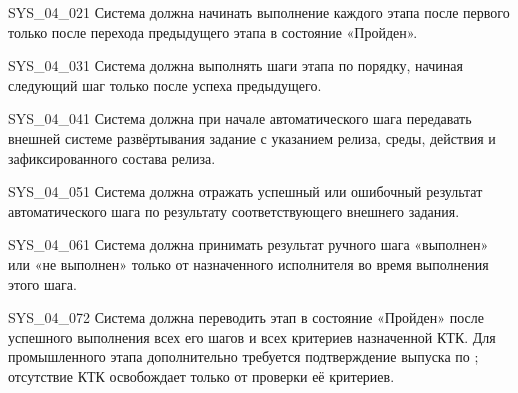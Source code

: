 \documentclass{tpks}
\begin{document}
\begin{req}{SYS_04_02}{1}
Система должна начинать выполнение каждого этапа после первого только после перехода предыдущего этапа в состояние «Пройден».
\end{req}

\begin{req}{SYS_04_03}{1}
Система должна выполнять шаги этапа по порядку, начиная следующий шаг только после успеха предыдущего.
\end{req}

\begin{req}{SYS_04_04}{1}
Система должна при начале автоматического шага передавать внешней системе развёртывания задание с указанием релиза, среды, действия и зафиксированного состава релиза.
\end{req}

\begin{req}{SYS_04_05}{1}
Система должна отражать успешный или ошибочный результат автоматического шага по результату соответствующего внешнего задания.
\end{req}

\begin{req}{SYS_04_06}{1}
Система должна принимать результат ручного шага «выполнен» или «не выполнен» только от назначенного исполнителя во время выполнения этого шага.
\end{req}

\begin{req}{SYS_04_07}{2}
Система должна переводить этап в состояние «Пройден» после успешного выполнения
всех его шагов и всех критериев назначенной КТК. Для промышленного этапа дополнительно
требуется подтверждение выпуска по ; отсутствие КТК освобождает
только от проверки её критериев.
\end{req}
\end{document}
